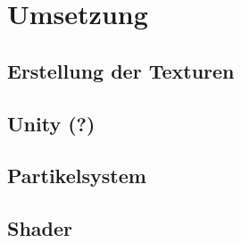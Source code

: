 \section{Umsetzung}
\subsection{Erstellung der Texturen}
\subsection{Unity (?)}
\subsection{Partikelsystem}
\subsection{Shader}


\newpage
